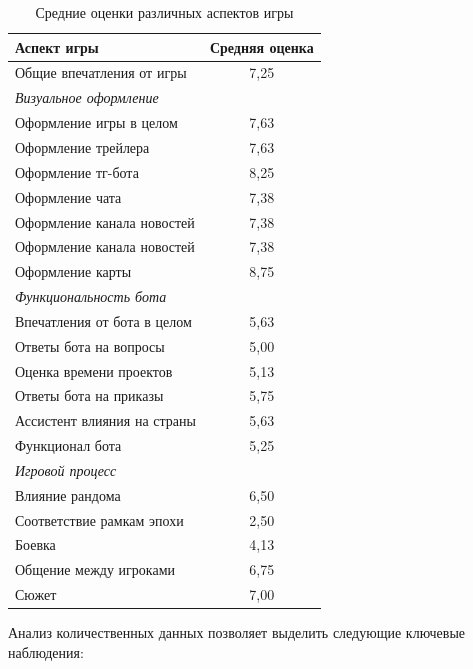 \begin{table}[h]
\centering
\begin{tabular}{|l|c|}
\hline
\textbf{Аспект игры} & \textbf{Средняя оценка} \\
\hline
Общие впечатления от игры & 7,25 \\
\hline
\multicolumn{2}{|l|}{\textit{Визуальное оформление}} \\
\hline
Оформление игры в целом & 7,63 \\
Оформление трейлера & 7,63 \\
Оформление тг-бота & 8,25 \\
Оформление чата & 7,38 \\
Оформление канала новостей & 7,38 \\
Оформление канала новостей & 7,38 \\
Оформление карты & 8,75 \\
\hline
\multicolumn{2}{|l|}{\textit{Функциональность бота}} \\
\hline
Впечатления от бота в целом & 5,63 \\
Ответы бота на вопросы & 5,00 \\
Оценка времени проектов & 5,13 \\
Ответы бота на приказы & 5,75 \\
Ассистент влияния на страны & 5,63 \\
Функционал бота & 5,25 \\
\hline
\multicolumn{2}{|l|}{\textit{Игровой процесс}} \\
\hline
Влияние рандома & 6,50 \\
Соответствие рамкам эпохи & 2,50 \\
Боевка & 4,13 \\
Общение между игроками & 6,75 \\
Сюжет & 7,00 \\
\hline
\end{tabular}
\caption{Средние оценки различных аспектов игры}
\label{tab:feedback-ratings}
\end{table}

Анализ количественных данных позволяет выделить следующие ключевые наблюдения:

